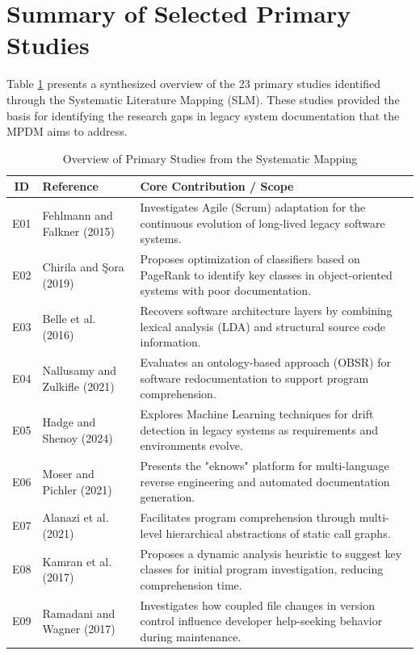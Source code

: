 \documentclass{ieeeaccess}
\begin{document}
\appendices
\section{\break Summary of Selected Primary Studies}
Table \ref{tab:slm_summary} presents a synthesized overview of the 23 primary studies identified through the Systematic Literature Mapping (SLM). These studies provided the basis for identifying the research gaps in legacy system documentation that the MPDM aims to address.

\begin{table}[h]
\caption{Overview of Primary Studies from the Systematic Mapping}
\label{tab:slm_summary}
\centering
\begin{tabular}{|c|p{150pt}|p{300pt}|}
\hline
\textbf{ID} & \textbf{Reference} & \textbf{Core Contribution / Scope} \\
\hline
E01 & Fehlmann and Falkner (2015) \cite{e01} & Investigates Agile (Scrum) adaptation for the continuous evolution of long-lived legacy software systems. \\ \hline
E02 & Chirila and Şora (2019) \cite{e02} & Proposes optimization of classifiers based on PageRank to identify key classes in object-oriented systems with poor documentation. \\ \hline
E03 & Belle et al. (2016) \cite{e03} & Recovers software architecture layers by combining lexical analysis (LDA) and structural source code information. \\ \hline
E04 & Nallusamy and Zulkifle (2021) \cite{e04} & Evaluates an ontology-based approach (OBSR) for software redocumentation to support program comprehension. \\ \hline
E05 & Hadge and Shenoy (2024) \cite{e05} & Explores Machine Learning techniques for drift detection in legacy systems as requirements and environments evolve. \\ \hline
E06 & Moser and Pichler (2021) \cite{e06} & Presents the "eknows" platform for multi-language reverse engineering and automated documentation generation. \\ \hline
E07 & Alanazi et al. (2021) \cite{e07} & Facilitates program comprehension through multi-level hierarchical abstractions of static call graphs. \\ \hline
E08 & Kamran et al. (2017) \cite{e08} & Proposes a dynamic analysis heuristic to suggest key classes for initial program investigation, reducing comprehension time. \\ \hline
E09 & Ramadani and Wagner (2017) \cite{e09} & Investigates how coupled file changes in version control influence developer help-seeking behavior during maintenance. \\ \hline

\end{tabular}
\end{table}
\end{document}

